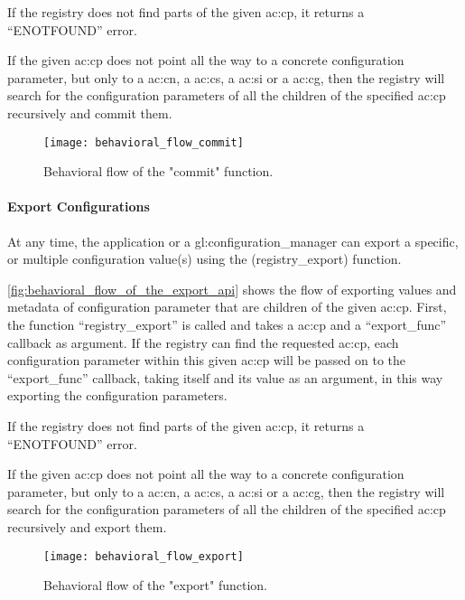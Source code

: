 If the registry does not find parts of the given \gls{ac:cp}, it returns a ``ENOTFOUND'' error.

If the given \gls{ac:cp} does not point all the way to a concrete configuration parameter, but only to a \gls{ac:cn}, a \gls{ac:cs}, a \gls{ac:si} or a \gls{ac:cg}, then the registry will search for the configuration parameters of all the children of the specified \gls{ac:cp} recursively and commit them.

\begin{figure}[H]
    \centering
    \texttt{[image: behavioral\_flow\_commit]}
    \caption{Behavioral flow of the "commit" function.}
    \label{fig:behavioral_flow_of_the_commit_api}
\end{figure}

\paragraph{Export Configurations}\mbox{}

At any time, the application or a \gls{gl:configuration_manager} can export a specific, or multiple configuration value(s) using the (registry\_export) function.

\autoref{fig:behavioral_flow_of_the_export_api} shows the flow of exporting values and metadata of configuration parameter that are children of the given \gls{ac:cp}.
First, the function ``registry\_export'' is called and takes a \gls{ac:cp} and a ``export\_func'' callback as argument.
If the registry can find the requested \gls{ac:cp}, each configuration parameter within this given \gls{ac:cp} will be passed on to the ``export\_func'' callback, taking itself and its value as an argument, in this way exporting the configuration parameters.

If the registry does not find parts of the given \gls{ac:cp}, it returns a ``ENOTFOUND'' error.

If the given \gls{ac:cp} does not point all the way to a concrete configuration parameter, but only to a \gls{ac:cn}, a \gls{ac:cs}, a \gls{ac:si} or a \gls{ac:cg}, then the registry will search for the configuration parameters of all the children of the specified \gls{ac:cp} recursively and export them.

\begin{figure}[H]
    \centering
    \texttt{[image: behavioral\_flow\_export]}
    \caption{Behavioral flow of the "export" function.}
    \label{fig:behavioral_flow_of_the_export_api}
\end{figure}

